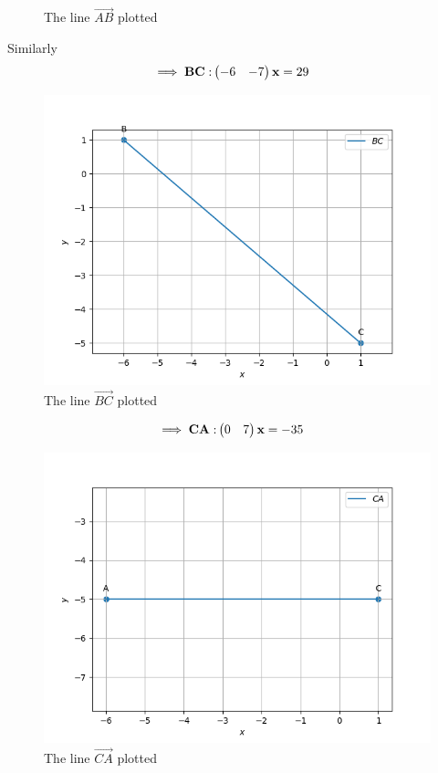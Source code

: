 \documentclass[11pt]{book}
\begin{document}
\begin{enumerate}[label=\thesection.\arabic*.,ref=\thesection.\theenumi]
\begin{figure}[H]
\caption{ The line $\vec{AB}$ plotted}
\label{fig:line AB}
\end{figure}
Similarly
\begin{align}
	\implies
	\mathbf{BC:} \begin{pmatrix}-6 & -7\end{pmatrix}\mathbf{x} &= 29
\end{align}
\begin{figure}[H]
\includegraphics [width=\columnwidth] {figs/BC.png}
\caption{ The line $\vec{BC}$ plotted}
\label{fig:line BC}
\end{figure}
\begin{align}
	\implies \mathbf{CA:} \begin{pmatrix}0 & 7\end{pmatrix}\mathbf{x} &= -35
\end{align}
\begin{figure}[H]
\includegraphics [width=\columnwidth] {figs/CA.png}
\caption{ The line $\vec{CA}$ plotted}
\label{fig:line CA}
\end{figure}


\end{enumerate}
\end{document}
